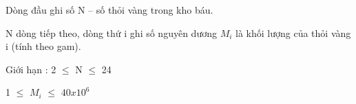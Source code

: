 Dòng đầu ghi số N – số thỏi vàng trong kho báu.


N dòng tiếp theo, dòng thứ i ghi số nguyên dương $M_{i}$ là khối lượng của thỏi vàng i (tính theo gam).

Giới hạn : 2  $\le$  N  $\le$  24

1  $\le$  $M_{i}$  $\le$  $40x10^{6}$